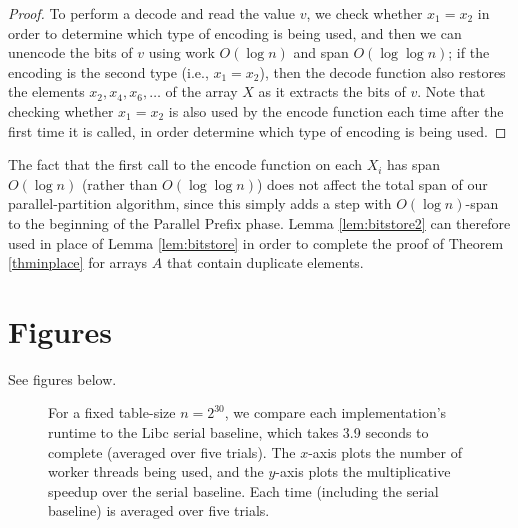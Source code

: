 \documentclass[sigplan, 10pt, nonacm]{acmart}
\theoremstyle{remark}
\theoremstyle{remark}
\begin{document}
\begin{appendices}
\begin{proof}
To perform a decode and read the value $v$, we check whether $x_1 =
x_2$ in order to determine which type of encoding is being used, and
then we can unencode the bits of $v$ using work $O(\log n)$ and span
$O(\log \log n)$; if the encoding is the second type (i.e., $x_1 =
x_2$), then the decode function also restores the elements $x_2, x_4,
x_6, \ldots$ of the array $X$ as it extracts the bits of $v$. Note
that checking whether $x_1 = x_2$ is also used by the encode function
each time after the first time it is called, in order determine which
type of encoding is being used.
\end{proof}

The fact that the first call to the encode function on each $X_i$ has
span $O(\log n)$ (rather than $O(\log \log n)$) does not affect the
total span of our parallel-partition algorithm, since this simply adds
a step with $O(\log n)$-span to the beginning of the Parallel Prefix
phase. Lemma \ref{lem:bitstore2} can therefore used in place of Lemma
\ref{lem:bitstore} in order to complete the proof of Theorem
\ref{thminplace} for arrays $A$ that contain duplicate elements.

\section{Figures}\label{sec:figures}
See figures below.
\begin{figure*}
  \begin{center}
    \CILKtable 
  \end{center}
    \caption{For a fixed table-size $n = 2^{30}$, we compare each
      implementation's runtime to the Libc serial baseline, which takes 3.9
      seconds to complete (averaged over five trials). The $x$-axis
      plots the number of worker threads being used, and the $y$-axis
      plots the multiplicative speedup over the serial baseline. Each
      time (including the serial baseline) is averaged over five trials.}
      \label{tablecilk}
\end{figure*}




\end{appendices}
\end{document}
